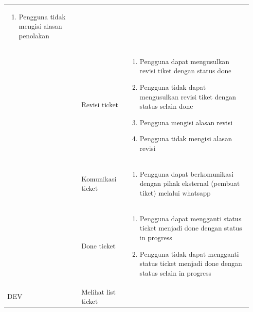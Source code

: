 \documentclass[12pt]{article}
\begin{document}
\begin{enumerate}[label=\textbf{5.\arabic*.}]
\begin{enumerate}[label=\textbf{5.2.\arabic*.}]
\begin{longtable}{ |l|l|p{}| }
\begin{enumerate}[label=\arabic*.]
                                                                \item Pengguna tidak mengisi alasan penolakan
                                                            \end{enumerate}\\\cline{2-3}
                                & Revisi ticket         & \begin{enumerate}[label=\arabic*.]
                                                                \item Pengguna dapat mengusulkan revisi tiket dengan status done
                                                                \item Pengguna tidak dapat mengusulkan revisi tiket dengan status selain done
                                                                \item Pengguna mengisi alasan revisi
                                                                \item Pengguna tidak mengisi alasan revisi
                                                            \end{enumerate}\\\cline{2-3}
                                & Komunikasi ticket     & \begin{enumerate}[label=\arabic*.]
                                                                \item Pengguna dapat berkomunikasi dengan pihak eksternal (pembuat tiket) melalui whatsapp 
                                                            \end{enumerate}\\\cline{2-3}
                                & Done ticket           & \begin{enumerate}[label=\arabic*.]
                                                                \item Pengguna dapat mengganti status ticket menjadi done dengan status in progress
                                                                \item Pengguna tidak dapat mengganti status ticket menjadi done dengan status selain in progress
                                                            \end{enumerate}\\\cline{2-3}
            \hline
            \multirow{4}{*}{DEV} & Melihat list ticket  & \begin{enumerate}[label=\arabic*.] 

\end{enumerate}
\end{longtable}
\end{enumerate}
\end{enumerate}
\end{document}
